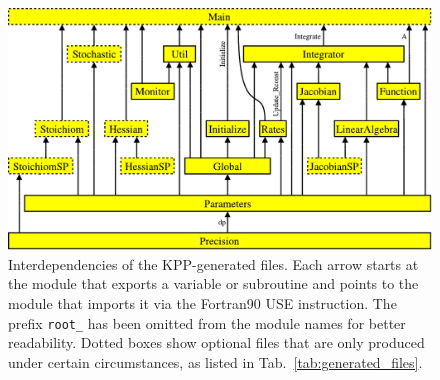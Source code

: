 \documentclass[twoside]{article}
\newcommand{\kpproot}{{\sc root}}
\begin{document}
\begin{figure}[htbp]
  \centering
  \includegraphics[width=\textwidth]{Figures/kpp2_use_diagr}
  \caption{Interdependencies of the KPP-generated
    files. Each arrow starts at the module that exports a variable or
    subroutine and points to the module that imports it via the
    Fortran90 USE instruction. The prefix \texttt{\kpproot\_} has been
    omitted from the module names for better readability. Dotted boxes
    show optional files that are only produced under certain
    circumstances, as listed in Tab.~\ref{tab:generated_files}.}
  \label{fig:use_diagr}
\end{figure}
\end{document}
